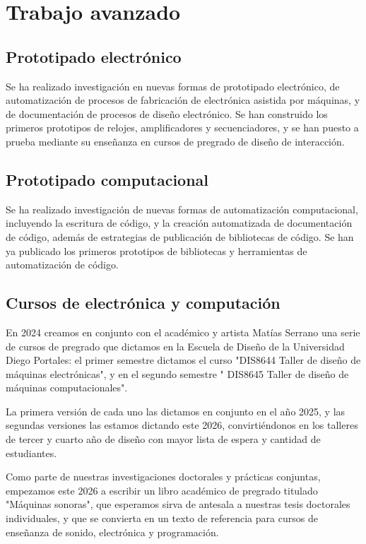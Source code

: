 \documentclass[../proyecto.tex]{subfiles}
\begin{document}
\chapter{Trabajo avanzado}


\section{Prototipado electrónico}

Se ha realizado investigación en nuevas formas de prototipado electrónico, de automatización de procesos de fabricación de electrónica asistida por máquinas, y de documentación de procesos de diseño electrónico. Se han construido los primeros prototipos de relojes, amplificadores y secuenciadores, y se han puesto a prueba mediante su enseñanza en cursos de pregrado de diseño de interacción.

\section{Prototipado computacional}

Se ha realizado investigación de nuevas formas de automatización computacional, incluyendo la escritura de código, y la creación automatizada de documentación de código, además de estrategias de publicación de bibliotecas de código. Se han ya publicado los primeros prototipos de bibliotecas y herramientas de automatización de código.

\section{Cursos de electrónica y computación}

En 2024 creamos en conjunto con el académico y artista Matías Serrano una serie de cursos de pregrado que dictamos en la Escuela de Diseño de la Universidad Diego Portales: el primer semestre dictamos el curso "DIS8644 Taller de diseño de máquinas electrónicas", y en el segundo semestre " DIS8645 Taller de diseño de máquinas computacionales".

La primera versión de cada uno las dictamos en conjunto en el año 2025, y las segundas versiones las estamos dictando este 2026, convirtiéndonos en los talleres de tercer y cuarto año de diseño con mayor lista de espera y cantidad de estudiantes. 

Como parte de nuestras investigaciones doctorales y prácticas conjuntas, empezamos este 2026 a escribir un libro académico de pregrado titulado "Máquinas sonoras", que esperamos sirva de antesala a nuestras tesis doctorales individuales, y que se convierta en un texto de referencia para cursos de enseñanza de sonido, electrónica y programación.
\end{document}
